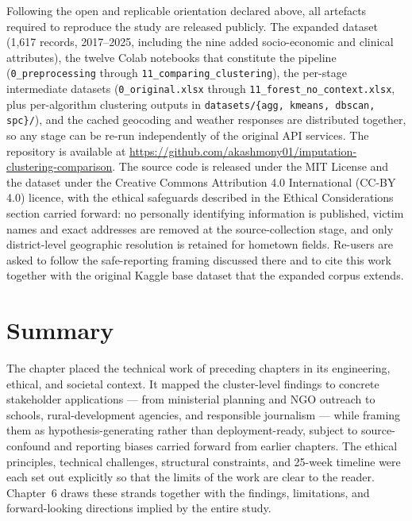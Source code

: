 Following the open and replicable orientation declared above, all artefacts required to reproduce the study are released publicly. The expanded dataset (1{,}617 records, 2017--2025, including the nine added socio-economic and clinical attributes), the twelve Colab notebooks that constitute the pipeline (\texttt{0\_preprocessing} through \texttt{11\_comparing\_clustering}), the per-stage intermediate datasets (\texttt{0\_original.xlsx} through \texttt{11\_forest\_no\_context.xlsx}, plus per-algorithm clustering outputs in \texttt{datasets/\{agg, kmeans, dbscan, spc\}/}), and the cached geocoding and weather responses are distributed together, so any stage can be re-run independently of the original API services. The repository is available at \url{https://github.com/akashmony01/imputation-clustering-comparison}. The source code is released under the MIT License and the dataset under the Creative Commons Attribution 4.0 International (CC-BY 4.0) licence, with the ethical safeguards described in the Ethical Considerations section carried forward: no personally identifying information is published, victim names and exact addresses are removed at the source-collection stage, and only district-level geographic resolution is retained for hometown fields. Re-users are asked to follow the safe-reporting framing discussed there and to cite this work together with the original Kaggle base dataset \cite{ref5} that the expanded corpus extends.

\section{Summary}

The chapter placed the technical work of preceding chapters in its engineering, ethical, and societal context. It mapped the cluster-level findings to concrete stakeholder applications --- from ministerial planning and NGO outreach to schools, rural-development agencies, and responsible journalism --- while framing them as hypothesis-generating rather than deployment-ready, subject to source-confound and reporting biases carried forward from earlier chapters. The ethical principles, technical challenges, structural constraints, and 25-week timeline were each set out explicitly so that the limits of the work are clear to the reader. Chapter~6 draws these strands together with the findings, limitations, and forward-looking directions implied by the entire study.
